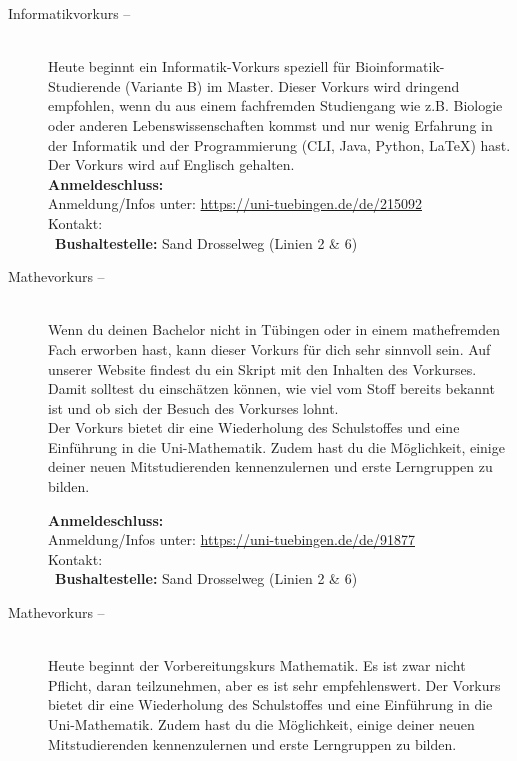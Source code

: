 \begin{description}
\ifmaster
    \ifbinfo
        \item[Informatikvorkurs -- \bioinfoDatum~\YEAR]\ \\
		Heute beginnt ein Informatik-Vorkurs speziell für Bioinformatik-Studierende (Variante B) im Master. 
		Dieser Vorkurs wird dringend empfohlen, wenn du aus einem fachfremden Studiengang wie z.B. Biologie oder anderen Lebenswissenschaften kommst und nur wenig Erfahrung in der Informatik und der Programmierung (CLI, Java, Python, \LaTeX) hast. Der Vorkurs wird auf Englisch gehalten. \\
		\textbf{Anmeldeschluss:} \bioinfoAnmeldung\YEAR\\
		Anmeldung/Infos unter: \url{https://uni-tuebingen.de/de/215092}\\
		Kontakt: \texttt{\bioinfoKontakt}\\
        ~\textbf{Bushaltestelle:} Sand Drosselweg (Linien 2 \& 6)
    \fi
\fi

\ifmaster
	\ifml %
	\else
		\ifkogwiss %
		\else
			\iflehramt %
			\else
				\item[Mathevorkurs -- \mathedatum~\YEAR]~\\
				Wenn du deinen Bachelor nicht in Tübingen oder in einem mathefremden Fach erworben hast, kann dieser Vorkurs für dich sehr sinnvoll sein. Auf unserer Website findest du ein Skript mit den Inhalten des Vorkurses. Damit solltest du einschätzen können, wie viel vom Stoff bereits bekannt ist und ob sich der Besuch des Vorkurses lohnt.\smallskip \\
				Der Vorkurs bietet dir eine Wiederholung des Schulstoffes und eine Einführung in die Uni-Mathematik. Zudem hast du die Möglichkeit, einige deiner neuen Mitstudierenden kennenzulernen und erste Lerngruppen zu bilden.

				\textbf{Anmeldeschluss:} \matheanmeldung\YEAR\\
				Anmeldung/Infos unter: \url{https://uni-tuebingen.de/de/91877}\\
				Kontakt: \texttt{\mathkontakt}\\
				\ifsommersemester
				~\textbf{Bushaltestelle:} Sand Drosselweg (Linien 2 \& 6) 
				\fi
			\fi
		\fi
	\fi
\fi

\ifbachelor
	\item[Mathevorkurs -- \mathedatum~\YEAR]~\\
	Heute beginnt der Vorbereitungskurs Mathematik. Es ist zwar nicht Pflicht, daran teilzunehmen, aber es ist sehr empfehlenswert.
	Der Vorkurs bietet dir eine Wiederholung des Schulstoffes und eine Einführung in die Uni-Mathematik. Zudem hast du die Möglichkeit, einige deiner neuen Mitstudierenden kennenzulernen und erste Lerngruppen zu bilden.


\end{description}
